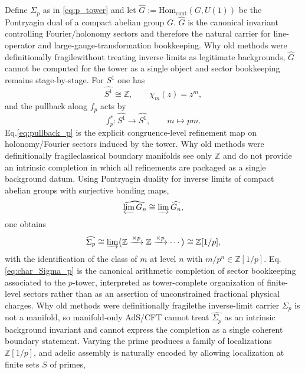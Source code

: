 \documentclass[11pt]{article}
\theoremstyle{remark}
\newcommand{\Z}{\mathbb{Z}}
\begin{document}
Define \(\Sigma_{p}\) as in \eqref{eq:p_tower} and let \(\widehat{G}:=\mathrm{Hom}_{\mathrm{cont}}(G,U(1))\) be the Pontryagin dual of a compact abelian group \(G\). \(\widehat{G}\) is the canonical invariant controlling Fourier/holonomy sectors and therefore the natural carrier for line-operator and large-gauge-transformation bookkeeping. Why old methods were definitionally fragile\:without treating inverse limits as legitimate backgrounds, \(\widehat{G}\) cannot be computed for the tower as a single object and sector bookkeeping remains stage-by-stage. For \(S^{1}\) one has
\begin{equation}\label{eq:char_S1_again}
\widehat{S^{1}}\cong \Z,\qquad \chi_{m}(z)=z^{m},
\end{equation}
and the pullback along \(f_p\) acts by
\begin{equation}\label{eq:pullback_p}
f_p^{*}:\widehat{S^{1}}\to \widehat{S^{1}},\qquad m\mapsto pm.
\end{equation}
Eq.\eqref{eq:pullback_p} is the explicit congruence-level refinement map on holonomy/Fourier sectors induced by the tower. Why old methods were definitionally fragile\:classical boundary manifolds see only \(\Z\) and do not provide an intrinsic completion in which all refinements are packaged as a single background datum. Using Pontryagin duality for inverse limits of compact abelian groups with surjective bonding maps,
\begin{equation}\label{eq:pontryagin_lim}
\widehat{\varprojlim G_{n}}\cong \varinjlim \widehat{G_{n}},
\end{equation}
one obtains
\begin{equation}\label{eq:char_Sigma_p}
\widehat{\Sigma_{p}}\cong \varinjlim\bigl(\Z\xrightarrow{\times p}\Z\xrightarrow{\times p}\cdots\bigr)\cong \Z[1/p],
\end{equation}
with the identification of the class of \(m\) at level \(n\) with \(m/p^{n}\in \Z[1/p]\). Eq.\eqref{eq:char_Sigma_p} is the canonical arithmetic completion of sector bookkeeping associated to the \(p\)-tower, interpreted as tower-complete organization of finite-level sectors rather than as an assertion of unconstrained fractional physical charges. Why old methods were definitionally fragile\:the inverse-limit carrier \(\Sigma_{p}\) is not a manifold, so manifold-only AdS/CFT cannot treat \(\widehat{\Sigma_{p}}\) as an intrinsic background invariant and cannot express the completion as a single coherent boundary statement. Varying the prime produces a family of localizations \(\Z[1/p]\), and adelic assembly is naturally encoded by allowing localization at finite sets \(S\) of primes,
\end{document}
